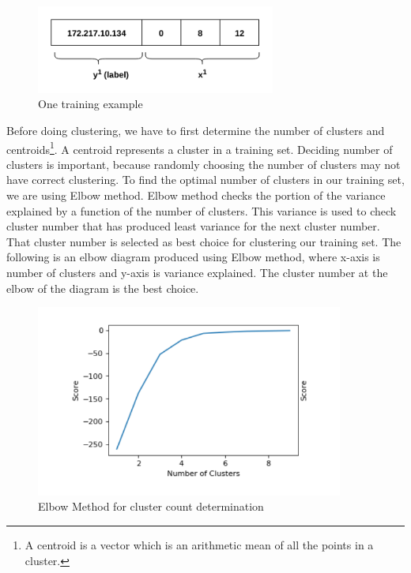 \documentclass[12pt,oneside,a4paper]{article}
\begin{document}
\begin{figure}[H]
\centering
\includegraphics[width=0.70\textwidth]{training_example.png}
\caption{One training example} \label{fig:training_example}
\end{figure}

Before doing clustering, we have to first determine the number of clusters and centroids\footnote{A centroid is a vector which is an arithmetic mean of all the points in a cluster.}. A centroid represents a cluster in a training set. Deciding number of clusters is important, because randomly choosing the number of clusters may not have correct clustering. To find the optimal number of clusters in our training set, we are using Elbow method. Elbow method checks the portion of the variance explained by a function of the number of clusters. This variance is used to check cluster number that has produced least variance for the next cluster number. That cluster number is selected as best choice for clustering our training set. The following is an elbow diagram produced using Elbow method, where x-axis is number of clusters and y-axis is variance explained. The cluster number at the elbow of the diagram is the best choice.

\begin{figure}[H]
\centering
\includegraphics[width=0.90\textwidth]{elbow-method.png}
\caption{Elbow Method for cluster count determination} \label{fig:elbow-method}
\end{figure}
\end{document}
